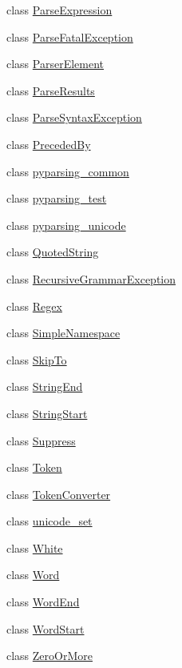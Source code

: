 \begin{DoxyCompactItemize}
class \hyperlink{classpip_1_1__vendor_1_1pyparsing_1_1ParseExpression}{Parse\+Expression}
\item 
class \hyperlink{classpip_1_1__vendor_1_1pyparsing_1_1ParseFatalException}{Parse\+Fatal\+Exception}
\item 
class \hyperlink{classpip_1_1__vendor_1_1pyparsing_1_1ParserElement}{Parser\+Element}
\item 
class \hyperlink{classpip_1_1__vendor_1_1pyparsing_1_1ParseResults}{Parse\+Results}
\item 
class \hyperlink{classpip_1_1__vendor_1_1pyparsing_1_1ParseSyntaxException}{Parse\+Syntax\+Exception}
\item 
class \hyperlink{classpip_1_1__vendor_1_1pyparsing_1_1PrecededBy}{Preceded\+By}
\item 
class \hyperlink{classpip_1_1__vendor_1_1pyparsing_1_1pyparsing__common}{pyparsing\+\_\+common}
\item 
class \hyperlink{classpip_1_1__vendor_1_1pyparsing_1_1pyparsing__test}{pyparsing\+\_\+test}
\item 
class \hyperlink{classpip_1_1__vendor_1_1pyparsing_1_1pyparsing__unicode}{pyparsing\+\_\+unicode}
\item 
class \hyperlink{classpip_1_1__vendor_1_1pyparsing_1_1QuotedString}{Quoted\+String}
\item 
class \hyperlink{classpip_1_1__vendor_1_1pyparsing_1_1RecursiveGrammarException}{Recursive\+Grammar\+Exception}
\item 
class \hyperlink{classpip_1_1__vendor_1_1pyparsing_1_1Regex}{Regex}
\item 
class \hyperlink{classpip_1_1__vendor_1_1pyparsing_1_1SimpleNamespace}{Simple\+Namespace}
\item 
class \hyperlink{classpip_1_1__vendor_1_1pyparsing_1_1SkipTo}{Skip\+To}
\item 
class \hyperlink{classpip_1_1__vendor_1_1pyparsing_1_1StringEnd}{String\+End}
\item 
class \hyperlink{classpip_1_1__vendor_1_1pyparsing_1_1StringStart}{String\+Start}
\item 
class \hyperlink{classpip_1_1__vendor_1_1pyparsing_1_1Suppress}{Suppress}
\item 
class \hyperlink{classpip_1_1__vendor_1_1pyparsing_1_1Token}{Token}
\item 
class \hyperlink{classpip_1_1__vendor_1_1pyparsing_1_1TokenConverter}{Token\+Converter}
\item 
class \hyperlink{classpip_1_1__vendor_1_1pyparsing_1_1unicode__set}{unicode\+\_\+set}
\item 
class \hyperlink{classpip_1_1__vendor_1_1pyparsing_1_1White}{White}
\item 
class \hyperlink{classpip_1_1__vendor_1_1pyparsing_1_1Word}{Word}
\item 
class \hyperlink{classpip_1_1__vendor_1_1pyparsing_1_1WordEnd}{Word\+End}
\item 
class \hyperlink{classpip_1_1__vendor_1_1pyparsing_1_1WordStart}{Word\+Start}
\item 
class \hyperlink{classpip_1_1__vendor_1_1pyparsing_1_1ZeroOrMore}{Zero\+Or\+More}
\end{DoxyCompactItemize}
